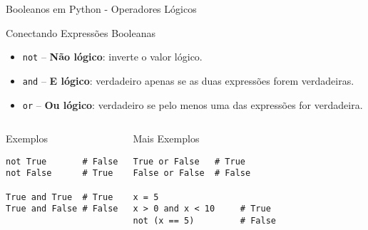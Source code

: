 \begin{frame}[fragile]{Booleanos em Python - Operadores Lógicos}

\begin{block}{Conectando Expressões Booleanas}
\begin{itemize}
    \item \texttt{not} – \textbf{Não lógico}: inverte o valor lógico.
    \item \texttt{and} – \textbf{E lógico}: verdadeiro apenas se as duas expressões forem verdadeiras.
    \item \texttt{or} – \textbf{Ou lógico}: verdadeiro se pelo menos uma das expressões for verdadeira.
\end{itemize}
\end{block}

\vspace{0.5em}

\begin{columns}[T]
    \begin{block}{Exemplos}
\begin{verbatim}
not True       # False
not False      # True

True and True  # True
True and False # False
\end{verbatim}
    \end{block}

    \begin{block}{Mais Exemplos}
\begin{verbatim}
True or False   # True
False or False  # False

x = 5
x > 0 and x < 10     # True
not (x == 5)         # False
\end{verbatim}
    \end{block}
\end{columns}

\end{frame}

